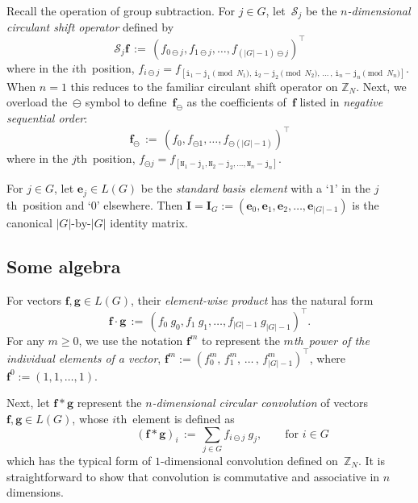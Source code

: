 \documentclass[letterpaper,11pt]{article}
\newcommand{\bs}[1]{{\boldsymbol{#1}}}
\newcommand{\gr}[1]{( #1 )}
\newcommand{\abs}[1]{\vert #1 \vert}
\newcommand{\vect}[1]{[ #1 ]}
\newcommand{\Int}{\mathbb Z}
\newcommand{\conv}{\ast}
\newcommand{\bcode}[1]{\texttt{#1}}
\newcommand{\ith}{$i$th}
\newcommand{\jth}{$j$th}
\newcommand{\mth}{$m$th}
\theoremstyle{definition} \newtheorem{remark}{Remark}
\begin{document}
Recall the operation of group subtraction. For $j\in G$, let~$\mathcal{S}_j$ be the \emph{$n$-dimensional circulant shift operator} defined by
\begin{equation} \label{Def:ShiftOperator}
\mathcal{S}_j\bs{f} \,:=\, \gr{f_{0\ominus j},f_{1\ominus j},\ldots,f_{\gr{\abs{G}-1}\ominus j}}^\top
\end{equation}
where in the \ith\ position, $f_{i\ominus j} = f_{\vect{\bcode{i}_1-\bcode{j}_1 \!\!\pmod{N_1},\, \bcode{i}_2-\bcode{j}_2 \!\!\pmod{N_2},\, \ldots\, , \, \bcode{i}_n-\bcode{j}_n \!\!\pmod{N_n}}}$. When $n=1$ this reduces to the familiar circulant shift operator on $\Int_N$. Next, we overload the~$\ominus$ symbol to define~$\bs{f}_{\!\ominus}$ as the coefficients of~$\bs{f}$ listed in \emph{negative sequential order}:
\begin{equation} \label{Def:fnc_f_ominus}
\bs{f}_{\!\ominus} \,:=\, \gr{f_0,f_{\ominus1},\ldots,f_{\ominus\gr{\abs{G}-1}}}^\top
\end{equation}
where in the \jth\ position, $f_{\ominus j} = f_{\vect{\bcode{N}_1-\bcode{j}_1, \bcode{N}_2-\bcode{j}_2, \ldots, \bcode{N}_n-\bcode{j}_n}}$.

For $j\in G$, let $\bs{e}_j\in L\gr{G}$ be the \emph{standard basis element} with a `$1$' in the \jth\ position and `$0$' elsewhere. Then $\bs{I} = \bs{I}_G := \gr{\bs{e}_0,\bs{e}_1,\bs{e}_2,\ldots,\bs{e}_{\abs{G}-1}}$ is the canonical $\abs{G}\text{-by-}\abs{G}$ identity matrix.


\subsection{Some algebra}
For vectors $\bs{f},\bs{g}\in L\gr{G}$, their \emph{element-wise product} has the natural form
\begin{equation} \label{Def:fdotg}
\bs{f}\cdot\bs{g} \,:=\, \gr{f_0\:\!g_0,f_1\:\!g_1,\ldots,f_{\abs{G}-1}\:\!g_{\abs{G}-1}}^\top.
\end{equation}
For any $m\geq0$, we use the notation $\bs{f}^m$ to represent the \emph{\mth\ power of the individual elements of a vector}, $\bs{f}^m := \gr{f^m_0,\,f^m_1,\,\ldots\,,\,f^m_{\abs{G}-1}}^\top$, where~$\bs{f}^0 := \gr{1,1,\ldots,1}$.

Next, let $\bs{f} \conv \bs{g}$ represent the \emph{$n$-dimensional circular convolution} of vectors $\bs{f},\bs{g}\in L\gr{G}$, whose \ith\ element is defined as
\begin{equation} \label{Def:Conv_finiteAbelianGroupG}
\qquad\qquad \gr{\bs{f} \conv \bs{g}}_i \,:=\, \sum_{j\in G} f_{i \ominus j} \:\! g_j, \qquad \text{for } i\in G
\end{equation}
which has the typical form of $1$-dimensional convolution defined on~$\Int_N$. It is straightforward to show that convolution is commutative and associative in $n$ dimensions.
\end{document}
